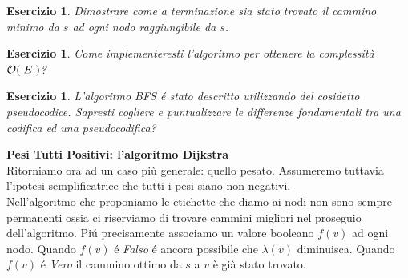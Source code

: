 \documentclass[10pt]{article}
\def\Ord{{\cal O}}
\newtheorem{Ese}[Teo]{Esercizio}
\begin{document}
\begin{Ese}
   Dimostrare come a terminazione sia stato
   trovato il cammino minimo da $s$ ad ogni nodo
   raggiungibile da $s$.
\end{Ese}

\begin{Ese}
    Come implementeresti l'algoritmo per ottenere la complessit\`a
    $\Ord(|E|)$?
\end{Ese}

\begin{Ese}
    L'algoritmo BFS \'e stato descritto utilizzando
    del cosidetto {\em pseudocodice}.
    Sapresti cogliere e puntualizzare
    le differenze fondamentali tra una
    codifica ed una pseudocodifica?
\end{Ese}

\vspace{1cm}
   {\Large \bf Pesi Tutti Positivi: l'algoritmo Dijkstra}\\

Ritorniamo ora ad un caso pi\`u generale: quello pesato.
Assumeremo tuttavia l'ipotesi semplificatrice che tutti
i pesi siano non-negativi.\\

Nell'algoritmo che proponiamo le etichette
che diamo ai nodi non sono sempre permanenti
ossia ci riserviamo di trovare cammini migliori
nel proseguio dell'algoritmo.
Pi\'u precisamente associamo un valore booleano
$f(v)$ ad ogni nodo.
Quando $f(v)$ \'e {\em Falso} \'e ancora possibile
che $\lambda(v)$ diminuisca.
Quando $f(v)$ \'e {\em Vero} il cammino
ottimo da $s$ a $v$ \`e gi\`a stato trovato.\\
\end{document}

